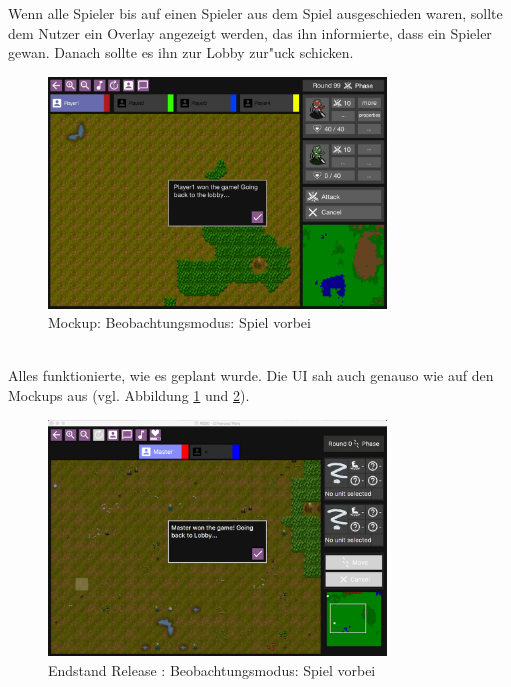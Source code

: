 \documentclass[12pt, titlepage]{scrartcl}
\newcommand{\RN}[1]{%
	\textup{\uppercase\expandafter{\romannumeral#1}}%
}
\begin{document}
					Wenn alle Spieler bis auf einen Spieler aus dem Spiel ausgeschieden waren, sollte dem Nutzer ein Overlay angezeigt werden, das ihn informierte, dass ein Spieler gewan. Danach sollte es ihn zur Lobby zur"uck schicken.
					\begin{figure}[H] 
						\centering
						\includegraphics[width=0.8\textwidth]{images/mockups/SpectatorEnd.png}
						\caption{Mockup: Beobachtungsmodus: Spiel vorbei}
						\label{Spectator_End_2}
					\end{figure}
					\ \\ Alles funktionierte, wie es geplant wurde. Die UI sah auch genauso wie auf den Mockups aus (vgl. Abbildung \ref{Spectator_End_2} und \ref{End_Spectator_End}).
					\begin{figure}[H] 
						\centering
						\includegraphics[width=0.8\textwidth]{images/endOfRelease/SpectatorEnd.png}
						\caption{Endstand Release \RN{3}: Beobachtungsmodus: Spiel vorbei}
						\label{End_Spectator_End}
					\end{figure}
\end{document}
